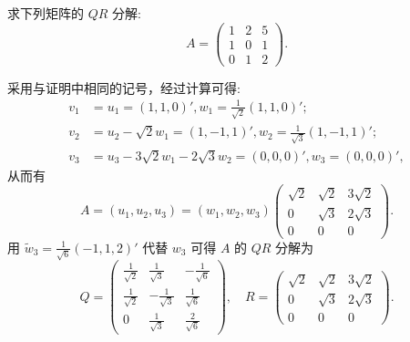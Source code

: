 \documentclass[../../main.tex]{subfiles}%
\begin{document}
\begin{example}
求下列矩阵的 $QR$ 分解:
\[
A = \begin{pmatrix}
1 & 2 & 5 \\
1 & 0 & 1 \\
0 & 1 & 2
\end{pmatrix}.
\]
\end{example}
\begin{solution}

采用与证明中相同的记号，经过计算可得:
\begin{align*}
v_1&=u_1=(1,1,0)' ,w_1=\frac{1}{\sqrt{2}}(1,1,0)' ;
\\
v_2&=u_2-\sqrt{2}w_1=(1,-1,1)' ,w_2=\frac{1}{\sqrt{3}}(1,-1,1)' ;
\\
v_3&=u_3-3\sqrt{2}w_1-2\sqrt{3}w_2=(0,0,0)' ,w_3=(0,0,0)',
\end{align*}
从而有
\[
A = (u_1,u_2,u_3) = (w_1,w_2,w_3)\begin{pmatrix}
\sqrt{2} & \sqrt{2} & 3\sqrt{2} \\
0 & \sqrt{3} & 2\sqrt{3} \\
0 & 0 & 0
\end{pmatrix}.
\]
用 $\widetilde{w}_3 = \frac{1}{\sqrt{6}}(-1,1,2)'$ 代替 $w_3$ 可得 $A$ 的 $QR$ 分解为
\[
Q = \begin{pmatrix}
\frac{1}{\sqrt{2}} & \frac{1}{\sqrt{3}} & -\frac{1}{\sqrt{6}} \\
\frac{1}{\sqrt{2}} & -\frac{1}{\sqrt{3}} & \frac{1}{\sqrt{6}} \\
0 & \frac{1}{\sqrt{3}} & \frac{2}{\sqrt{6}}
\end{pmatrix}, \quad
R = \begin{pmatrix}
\sqrt{2} & \sqrt{2} & 3\sqrt{2} \\
0 & \sqrt{3} & 2\sqrt{3} \\
0 & 0 & 0
\end{pmatrix}.
\] 

\end{solution}
\end{document}
